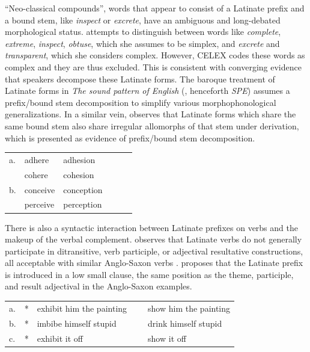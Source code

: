 ``Neo-classical compounds'', words that appear to consist of a Latinate prefix and a bound stem, like \emph{inspect} or \emph{excrete}, have an ambiguous and long-debated morphological status. \citeauthor{Pierrehumbert1994} attempts to distinguish between words like \emph{complete}, \emph{extreme}, \emph{inspect}, \emph{obtuse}, which she assumes to be simplex, and \emph{excrete} and \emph{transparent}, which she considers complex. However, CELEX codes these words as complex and they are thus excluded. This is consistent with converging evidence that speakers decompose these Latinate forms. The baroque treatment of Latinate forms in \emph{The sound pattern of English} (\citealp{SPE}, henceforth \emph{SPE}) assumes a prefix/bound stem decomposition to simplify various morphophonological generalizations.  In a similar vein, \citet[11--13]{Aronoff1976} observes that Latinate forms which share the same bound stem also share irregular allomorphs of that stem under derivation, which is presented as evidence of prefix/bound stem decomposition.


\begin{example}
\begin{tabular}{l l l l l l}
a. & {adhere}   & {adhesion}   \\
   & {cohere}   & {cohesion}   \\
b. & {conceive} & {conception} \\
   & {perceive} & {perception} \\
\end{tabular}
\end{example}

There is also a syntactic interaction between Latinate prefixes on verbs and the makeup of the verbal complement. \citet{Harley2009} observes that Latinate verbs do not generally participate in ditransitive, verb participle, or adjectival resultative constructions, all acceptable with similar Anglo-Saxon verbs \citep[see also][]{Gropen1989,Coppock2008}. \citeauthor{Harley2009} proposes that the Latinate prefix is introduced in a low small clause, the same position as the theme, participle, and result adjectival in the Anglo-Saxon examples.

\begin{example} \label{harley}
\begin{tabular}{ll@{}ll@{}l}
a. & * & {exhibit him the painting} & ~ & {show him the painting} \\
b. & * & {imbibe himself stupid}    & ~ & {drink himself stupid}  \\
c. & * & {exhibit it off}           & ~ & {show it off}           \\
\end{tabular}
\end{example}

